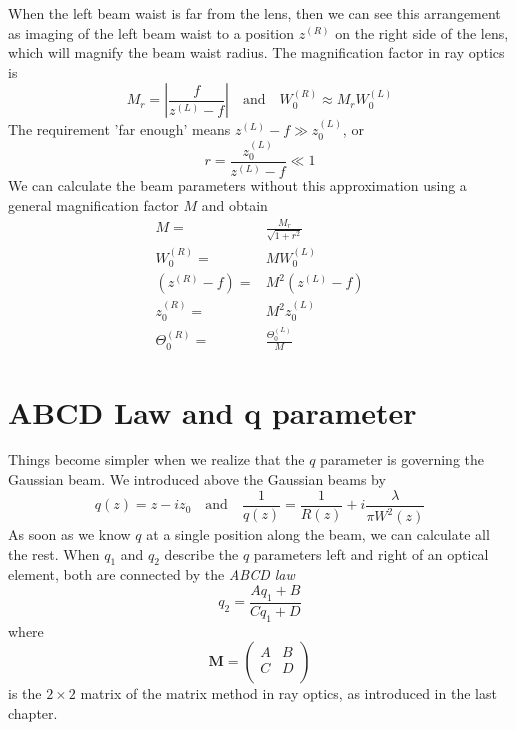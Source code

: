 When the left beam waist is far from the lens, then we can see this arrangement as imaging of the left beam waist to a position $z^{(R)}$ on the right side  of the lens, which will magnify the beam waist radius. The magnification factor in ray optics is 
\begin{equation}
    M_r = \left| \frac{f}{z^{(L)} -f}  \right| \quad \text{and} \quad W_0^{(R)} \approx M_r W_0^{(L)} 
\end{equation}
The requirement 'far enough' means $z^{(L)} - f \gg z_0^{(L)} $, or
\begin{equation}
    r = \frac{z_0^{(L)} }{z^{(L)}  - f} \ll 1
\end{equation}
We can calculate the beam parameters without  this approximation using a general magnification factor $M$ and obtain
\begin{align}
    M = & \frac{M_r}{\sqrt{1 + r^2}} \\
    W_0^{(R)}  = & M W_0^{(L)}  \\
    (z^{(R)} - f) = &M^2 (z^{(L)} -f) \\
    z_0^{(R)} = & M^2 z_0^{(L)}  \\
    \Theta_0^{(R)} = & \frac{\Theta_0^{(L)} }{M}
\end{align}

\section{ABCD Law and q parameter}

Things become simpler when we realize that the $q$ parameter is governing the Gaussian beam. We introduced above the Gaussian beams by 
\begin{equation}
    q(z) = z - i z_0 \quad \text{and} \quad
    \frac{1}{q(z)} = \frac{1}{R(z)} + i \frac{\lambda}{\pi W^2(z)}
\end{equation} 
As soon as we know $q$ at a single position along the beam, we can calculate all the rest. When $q_1$  and $q_2$ describe the $q$ parameters left and right of an optical element, both are connected by the \emph{ABCD law}
\begin{equation}
    q_2 = \frac{A q_1 + B}{C q_1 + D}
\end{equation}
where 
\begin{equation}
\boldsymbol{M} = 
\begin{pmatrix}
    A & B \\ C & D \\
\end{pmatrix}
\end{equation}
is the $2\times2$ matrix of the matrix method in ray optics, as introduced in the last chapter.

